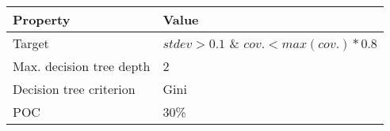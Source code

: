 \begin{tabular}{ll}
\hline
Property                     & Value                                     \\
\hline
Target                       & $stdev > 0.1$ \& $cov. < max(cov.) * 0.8$ \\
Max. decision tree depth     & 2                                         \\
Decision tree criterion      & Gini                                      \\
POC                          & 30\%                                      \\
\hline
\end{tabular}